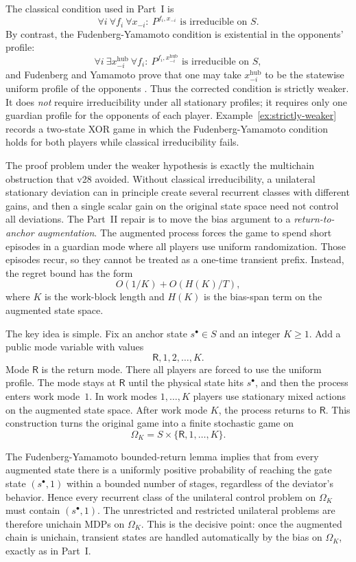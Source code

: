 \documentclass[11pt]{article}
\theoremstyle{definition}
\newcommand{\1}{\mathbf{1}}
\begin{document}
The classical condition used in Part~I is
\[
\forall i\ \forall f_i\ \forall x_{-i}:\ P^{f_i,x_{-i}}\text{ is irreducible on }S.
\]
By contrast, the Fudenberg-Yamamoto condition is existential in the opponents' profile:
\[
\forall i\ \exists x_{-i}^{\mathrm{hub}}\ \forall f_i:\ P^{f_i,x_{-i}^{\mathrm{hub}}}\text{ is irreducible on }S,
\]
and Fudenberg and Yamamoto prove that one may take $x_{-i}^{\mathrm{hub}}$ to be the statewise uniform profile of the opponents \cite[Definition~5 and Lemma~1]{FudenbergYamamoto2011}. Thus the corrected condition is strictly weaker. It does \emph{not} require irreducibility under all stationary profiles; it requires only one guardian profile for the opponents of each player. Example~\ref{ex:strictly-weaker} records a two-state XOR game in which the Fudenberg-Yamamoto condition holds for both players while classical irreducibility fails.

The proof problem under the weaker hypothesis is exactly the multichain obstruction that v28 avoided. Without classical irreducibility, a unilateral stationary deviation can in principle create several recurrent classes with different gains, and then a single scalar gain on the original state space need not control all deviations. The Part~II repair is to move the bias argument to a \emph{return-to-anchor augmentation}. The augmented process forces the game to spend short episodes in a guardian mode where all players use uniform randomization. Those episodes recur, so they cannot be treated as a one-time transient prefix. Instead, the regret bound has the form
\[
O(1/K)+O(H(K)/T),
\]
where $K$ is the work-block length and $H(K)$ is the bias-span term on the augmented state space.

The key idea is simple. Fix an anchor state $s^\bullet\in S$ and an integer $K\ge1$. Add a public mode variable with values
\[
\mathsf R,1,2,\dots,K.
\]
Mode $\mathsf R$ is the return mode. There all players are forced to use the uniform profile. The mode stays at $\mathsf R$ until the physical state hits $s^\bullet$, and then the process enters work mode~$1$. In work modes $1,\dots,K$ players use stationary mixed actions on the augmented state space. After work mode $K$, the process returns to $\mathsf R$. This construction turns the original game into a finite stochastic game on
\[
\Omega_K=S\times\{\mathsf R,1,\dots,K\}.
\]

The Fudenberg-Yamamoto bounded-return lemma implies that from every augmented state there is a uniformly positive probability of reaching the gate state $(s^\bullet,1)$ within a bounded number of stages, regardless of the deviator's behavior. Hence every recurrent class of the unilateral control problem on $\Omega_K$ must contain $(s^\bullet,1)$. The unrestricted and restricted unilateral problems are therefore unichain MDPs on $\Omega_K$. This is the decisive point: once the augmented chain is unichain, transient states are handled automatically by the bias on $\Omega_K$, exactly as in Part~I.
\end{document}
